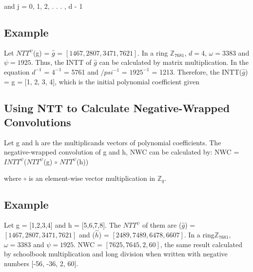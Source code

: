 \documentclass{techrep}
\theoremstyle{definition}
\theoremstyle{plain}
\newcommand{\Z}{\mathbb{Z}}
\begin{document}
and j = 0, 1, 2, . . . , d - 1

\subsection{Example}

Let ${NTT}^\psi$(g) = $\hat{g}$ = $[1467,2807,3471,7621]$. In a ring $\Z_{7681}$, $d = 4$, $\omega =3383$ and $\psi =1925$. Thus, the INTT of $\hat{g}$ can be calculated by matrix multiplication. In the equation $d^{-1}$ = $4^{-1}$ = 5761 and $/psi^{-1}$ = ${1925}^{-1}$ = 1213. Therefore, the INTT($\hat{g}$) = g = [1, 2, 3, 4], which is the initial polynomial coefficient given  

\subsection{Using NTT to Calculate Negative-Wrapped Convolutions}

Let g and h are the multiplicands vectors of polynomial coefficients. The negative-wrapped convolution of g and h, NWC can be calculated by:
NWC = ${INTT}^\psi$(${NTT}^\psi$(g) $\circ$ ${NTT}^\psi$(h))

where $\circ$ is an element-wise vector multiplication in $\Z_{q}$.

\subsection{Example}
Let g = [1,2,3,4] and h = [5,6,7,8]. The ${NTT}^\psi$ of them are ($\hat{g}$) = $[1467,2807,3471,7621]$ and ($\hat{h}$) = $[2489,7489,6478,6607]$. In a ring$\Z_{7681}$, $\omega =3383$ and $\psi =1925$. NWC = $[7625, 7645, 2, 60]$, the same result calculated by schoolbook multiplication and long division when written with negative numbers [-56, -36, 2, 60].
\end{document}
